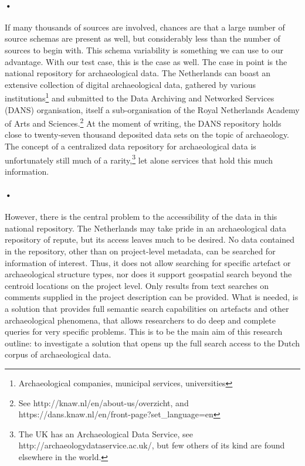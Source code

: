 \documentclass[12pt,twoside,a4paper]{article}
\begin{document}
\paragraph{•}
If many thousands of sources are involved, chances are that a large number of source schemas are present as well, but considerably less than the number of sources to begin with. 
This schema variability is something we can use to our advantage. 
With our test case, this is the case as well. 
The case in point is the national repository for archaeological data. 
The Netherlands can boast an extensive collection of digital archaeological data, gathered by various institutions\footnote{Archaeological companies, municipal services, universities} and submitted to the Data Archiving and Networked Services (DANS) organisation, itself a sub-organisation of the Royal Netherlands Academy of Arts and Sciences.\footnote{See http://knaw.nl/en/about-us/overzicht, and https://dans.knaw.nl/en/front-page?set\_language=en} 
At the moment of writing, the DANS repository holds close to twenty-seven thousand deposited data sets on the topic of archaeology. 
The concept of a centralized data repository for archaeological data is unfortunately still much of a rarity,\footnote{The UK has an Archaeological Data Service, see http://archaeologydataservice.ac.uk/, but few others of its kind are found elsewhere in the world.} let alone services that hold this much information.
\paragraph{•}
However, there is the central problem to the accessibility of the data in this national repository. 
The Netherlands may take pride in an archaeological data repository of repute, but its access leaves much to be desired. 
No data contained in the repository, other than on project-level metadata, can be searched for information of interest. 
Thus, it does not allow searching for specific artefact or archaeological structure types, nor does it support geospatial search beyond the centroid locations on the project level. 
Only results from text searches on comments supplied in the project description can be provided. 
What is needed, is a solution that provides full semantic search capabilities on artefacts and other archaeological phenomena, that allows researchers to do deep and complete queries for very specific problems. 
This is to be the main aim of this research outline: to investigate a solution that opens up the full search access to the Dutch corpus of archaeological data.
\end{document}
